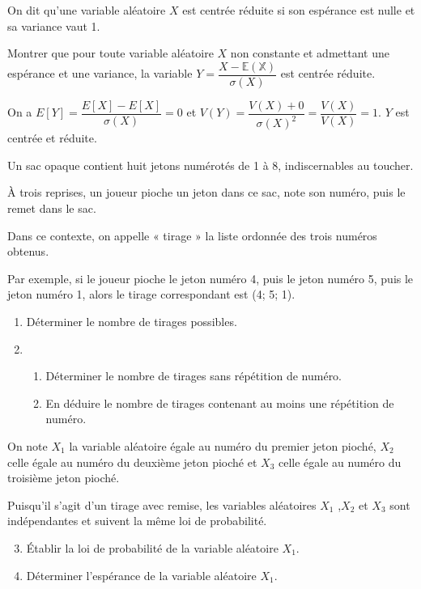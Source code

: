 \documentclass[11pt,fleqn, openany]{book} %
\begin{document}
\begin{exercise}On dit qu'une variable aléatoire $X$ est centrée réduite si son espérance est nulle et sa variance vaut 1. 

Montrer que pour toute variable aléatoire $X$ non constante et admettant une espérance et une variance, la variable $Y=\dfrac{X-\mathbb{E(X)}}{\sigma (X)}$ est centrée réduite.\newpage \end{exercise}

\begin{solution}On a $E[Y]=\dfrac{E[X]-E[X]}{\sigma(X)}=0$ et $V(Y) = \dfrac{V(X)+0}{\sigma(X)^2}=\dfrac{V(X)}{V(X)}=1$. $Y$ est centrée et réduite.\end{solution}





\begin{exercise}[subtitle={(Centres étrangers 2024)}]

Un sac opaque contient huit jetons numérotés de 1 à 8, indiscernables au toucher.

À trois reprises, un joueur pioche un jeton dans ce sac, note son numéro, puis le remet dans le sac.

Dans ce contexte, on appelle « tirage » la liste ordonnée des trois numéros obtenus.

Par exemple, si le joueur pioche le jeton numéro 4, puis le jeton numéro 5, puis le jeton numéro 1, alors le tirage correspondant est (4; 5; 1).
\begin{enumerate}
\item Déterminer le nombre de tirages possibles.
\item \begin{enumerate}
\item Déterminer le nombre de tirages sans répétition de numéro.
\item En déduire le nombre de tirages contenant au moins une répétition de numéro.\end{enumerate}\end{enumerate}
On note $X_1$ la variable aléatoire égale au numéro du premier jeton pioché, $X_2$ celle égale au numéro du deuxième jeton pioché et $X_3$ celle égale au numéro du troisième jeton pioché.

Puisqu'il s'agit d'un tirage avec remise, les variables aléatoires $X_1$ ,$X_2$ et $X_3$ sont indépendantes et suivent la même loi de probabilité.

\begin{enumerate}
\setcounter{enumi}{2}
\item Établir la loi de probabilité de la variable aléatoire $X_1$.
\item Déterminer l'espérance de la variable aléatoire $X_1$.\end{enumerate}


\end{exercise}
\end{document}
